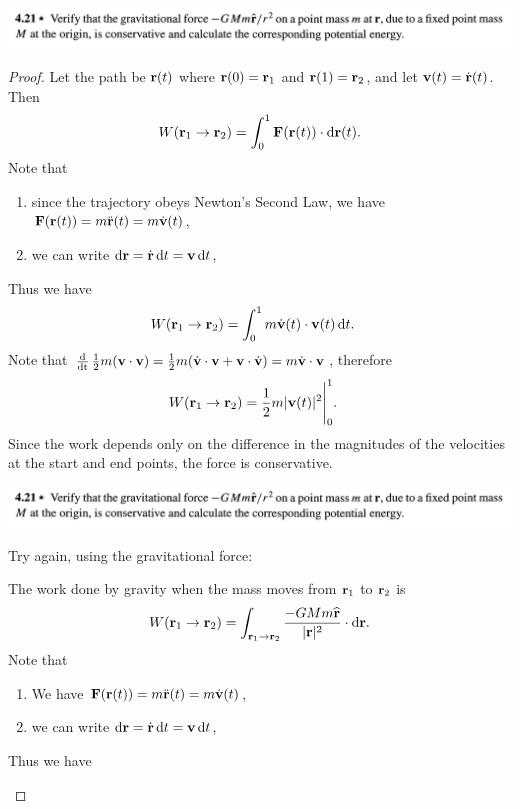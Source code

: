 \begin{mdframed}
  \includegraphics[width=400pt]{img/physics--classical-mechanics--taylor--q-4-21.png}
\end{mdframed}

\begin{proof}
  Let the path be $\mathbf{r}(t)$ where $\mathbf{r}(0) = \mathbf{r}_1$ and $\mathbf{r}(1) = \mathbf{r}_2$, and let $\mathbf v(t) = \dot{\mathbf{r}}(t)$. Then
  \begin{align*}
    W(\r_1 \to \r_2) = \int_0^1 \F(\r(t)) \cdot \d\r(t).
  \end{align*}
  Note that
  \begin{enumerate}
  \item since the trajectory obeys Newton's Second Law, we have $\mathbf{F}(\mathbf{r}(t)) = m\ddot{\mathbf{r}}(t) = m\dot{\mathbf v}(t)$,
  \item we can write $\d\r = \dot{\r} \dt = \v \dt$,
  \end{enumerate}
  Thus we have
\begin{align*}
  W(\r_1 \to \r_2) &= \int_0^1 m\dot{\v}(t) \cdot \v(t) \dt.
\end{align*}
Note that $\operatorname{\frac{\text{d}}{\text{dt}}} \frac{1}{2}m(\mathbf v \cdot \mathbf v) = \frac{1}{2}m(\dot{\mathbf v} \cdot \mathbf v + \mathbf v \cdot \dot{\mathbf v}) = m\dot{\mathbf v} \cdot \mathbf v$, therefore
\begin{align*}
  W(\mathbf{r}_1 \to \mathbf{r}_2) &= \frac{1}{2}m|\mathbf v(t)|^2\Bigg|_0^1.
\end{align*}
Since the work depends only on the difference in the magnitudes of the velocities at the start and
end points, the force is conservative.


\newpage
\begin{mdframed}
  \includegraphics[width=400pt]{img/physics--classical-mechanics--taylor--q-4-21.png}
\end{mdframed}



\begin{mdframed}
  Try again, using the gravitational force:

  The work done by gravity when the mass moves from $\mathbf{r}_1$ to $\mathbf{r}_2$ is
  \begin{align*}
    W(\r_1 \to \r_2) = \int_{\r_1 \to \r_2} \frac{-GMm\hat{\r}}{|\r|^2} \cdot \d\r.
  \end{align*}
  Note that
  \begin{enumerate}
  \item We have $\mathbf{F}(\mathbf{r}(t)) = m\ddot{\mathbf{r}}(t) = m\dot{\mathbf v}(t)$,
  \item we can write $\d\r = \dot{\r} \dt = \v \dt$,
  \end{enumerate}
  Thus we have

\end{mdframed}

\end{proof}


